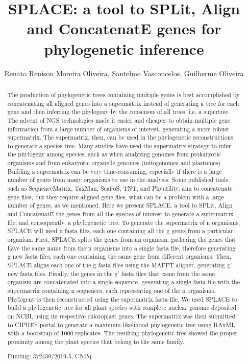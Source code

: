 \documentclass[twoside]{article}
\title{\vspace{-15mm}\fontsize{24pt}{10pt}\selectfont\textbf{ SPLACE: a tool to SPLit,  Align and ConcatenatE genes for phylogenetic inference }} %
\author{ Renato Renison Moreira Oliveira, Santelmo Vasconcelos, Guilherme Oliveira }
\affil{ Universidade Federal de Minas Gerais }
\date{}
\begin{document}
  
  
  \maketitle %
  
  
  \thispagestyle{fancy} %
  
  
  \begin{abstract}
  The production of phylogenetic trees containing multiple genes is best accomplished by concatenating all aligned genes into a supermatrix instead of generating a tree for each gene and then inferring the phylogeny by the consensus of all trees,  i.e. a supertree. The advent of NGS technologies made it easier and cheaper to obtain multiple gene information from a large number of organisms of interest,  generating a more robust supermatrix. The supermatrix,  then,  can be used in the phylogenetic reconstructions to generate a species tree. Many studies have used the supermatrix strategy to infer the phylogeny among species,  such as when analyzing genomes from prokaryotic organisms and from eukaryotic organelle genomes (mitogenomes and plastomes). Building a supermatrix can be very time-consuming,  especially if there is a large number of genes from many organisms to use in the analysis. Some published tools,  such as SequenceMatrix,  TaxMan,  ScaFoS,  TNT,  and Phyutility,  aim to concatenate gene files,  but they require aligned gene files,  what can be a problem with a large number of genes,  as we mentioned. Here we present SPLACE,  a tool to SPLit,  Align and ConcatenatE the genes from all the species of interest to generate a supermatrix file,  and consequently,  a phylogenetic tree. To generate the supermatrix of n organisms,  SPLACE will need n fasta files,  each one containing all the g genes from a particular organism. First,  SPLACE splits the genes from an organism,  gathering the genes that have the same name from the n organisms into a single fasta file,  therefore generating g new fasta files,  each one containing the same gene from different organisms. Then,  SPLACE aligns each one of the g fasta files using the MAFFT aligner,  generating g’ new fasta files. Finally,  the genes in the g’ fasta files that came from the same organism are concatenated into a single sequence,  generating a single fasta file with the supermatrix containing n sequences,  each representing one of the n organisms. Phylogeny is then reconstructed using the supermatrix fasta file. We used SPLACE to build a phylogenetic tree for all plant species with complete nuclear genome deposited on NCBI,  using its respective chloroplast genes. The supermatrix was then submitted to CIPRES portal to generate a maximum likelihood phylogenetic tree using RAxML,  with a bootstrap of 1000 replicates. The resulting phylogenetic tree showed the proper proximity among the plant species that belong to the same family.
  
  Funding: 372439/2019-5,  CNPq \\ 
  \end{abstract}
  
\end{document}
